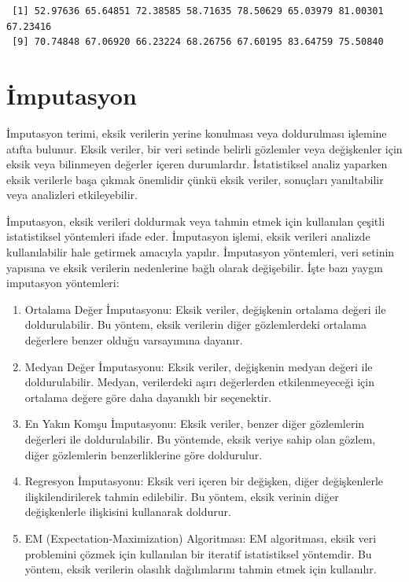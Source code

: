 \documentclass[
  letterpaper,
  DIV=11,
  numbers=noendperiod]{scrreprt}
\begin{document}
\begin{verbatim}
 [1] 52.97636 65.64851 72.38585 58.71635 78.50629 65.03979 81.00301 67.23416
 [9] 70.74848 67.06920 66.23224 68.26756 67.60195 83.64759 75.50840
\end{verbatim}

\hypertarget{imputasyon}{%
\section*{İmputasyon}\label{imputasyon}}


İmputasyon terimi, eksik verilerin yerine konulması veya doldurulması
işlemine atıfta bulunur. Eksik veriler, bir veri setinde belirli
gözlemler veya değişkenler için eksik veya bilinmeyen değerler içeren
durumlardır. İstatistiksel analiz yaparken eksik verilerle başa çıkmak
önemlidir çünkü eksik veriler, sonuçları yanıltabilir veya analizleri
etkileyebilir.

İmputasyon, eksik verileri doldurmak veya tahmin etmek için kullanılan
çeşitli istatistiksel yöntemleri ifade eder. İmputasyon işlemi, eksik
verileri analizde kullanılabilir hale getirmek amacıyla yapılır.
İmputasyon yöntemleri, veri setinin yapısına ve eksik verilerin
nedenlerine bağlı olarak değişebilir. İşte bazı yaygın imputasyon
yöntemleri:

\begin{enumerate}
\def\labelenumi{\arabic{enumi}.}
\item
  Ortalama Değer İmputasyonu: Eksik veriler, değişkenin ortalama değeri
  ile doldurulabilir. Bu yöntem, eksik verilerin diğer gözlemlerdeki
  ortalama değerlere benzer olduğu varsayımına dayanır.
\item
  Medyan Değer İmputasyonu: Eksik veriler, değişkenin medyan değeri ile
  doldurulabilir. Medyan, verilerdeki aşırı değerlerden etkilenmeyeceği
  için ortalama değere göre daha dayanıklı bir seçenektir.
\item
  En Yakın Komşu İmputasyonu: Eksik veriler, benzer diğer gözlemlerin
  değerleri ile doldurulabilir. Bu yöntemde, eksik veriye sahip olan
  gözlem, diğer gözlemlerin benzerliklerine göre doldurulur.
\item
  Regresyon İmputasyonu: Eksik veri içeren bir değişken, diğer
  değişkenlerle ilişkilendirilerek tahmin edilebilir. Bu yöntem, eksik
  verinin diğer değişkenlerle ilişkisini kullanarak doldurur.
\item
  EM (Expectation-Maximization) Algoritması: EM algoritması, eksik veri
  problemini çözmek için kullanılan bir iteratif istatistiksel
  yöntemdir. Bu yöntem, eksik verilerin olasılık dağılımlarını tahmin
  etmek için kullanılır.
\end{enumerate}
\end{document}
